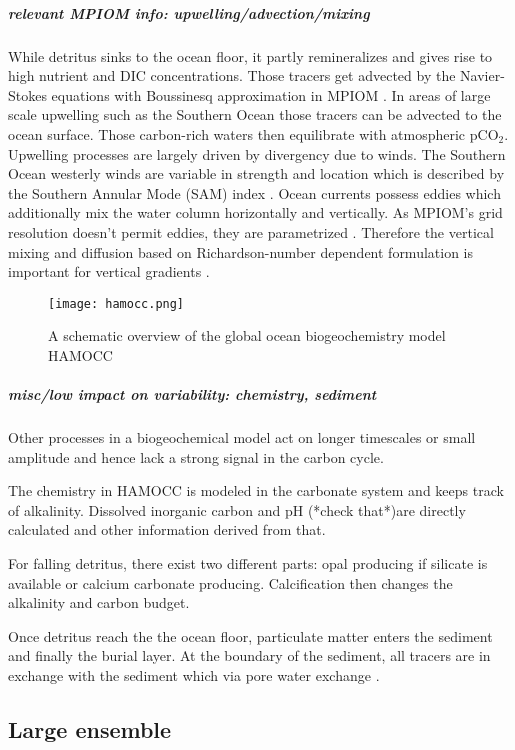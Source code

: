 \documentclass[12pt]{article}
\begin{document}
\subparagraph{relevant MPIOM info: upwelling/advection/mixing}
While detritus sinks to the ocean floor, it partly remineralizes and gives rise to high nutrient and DIC concentrations. Those tracers get advected by the Navier-Stokes equations with Boussinesq approximation in MPIOM \citep{Marsland2003}. In areas of large scale upwelling such as the Southern Ocean those tracers can be advected to the ocean surface. Those carbon-rich waters then equilibrate with atmospheric pCO$_2$. Upwelling processes are largely driven by divergency due to winds. The Southern Ocean westerly winds are variable in strength and location which is described by the Southern Annular Mode (SAM) index \citep{Gong1999}. Ocean currents possess eddies which additionally mix the water column horizontally and vertically. As MPIOM's grid resolution doesn't permit eddies, they are parametrized \citep{Gent1995}. Therefore the vertical mixing and diffusion based on Richardson-number dependent formulation is important for vertical gradients \citep{Pacanowski1981}. 

\begin{figure}[h!]
	\centering
	\texttt{[image: hamocc.png]}
	\caption{A schematic overview of the global ocean biogeochemistry model HAMOCC \citep{Ilyina2013}}
	\label{fig:HAMOCC}
\end{figure}

\subparagraph{misc/low impact on variability: chemistry, sediment}
Other processes in a biogeochemical model act on longer timescales or small amplitude and hence lack a strong signal in the carbon cycle. 

The chemistry in HAMOCC is modeled in the carbonate system and keeps track of alkalinity. Dissolved inorganic carbon and pH (*check that*)are directly calculated and other information derived from that.

For falling detritus, there exist two different parts: opal producing if silicate is available or calcium carbonate producing. Calcification then changes the alkalinity and carbon budget.

Once detritus reach the the ocean floor, particulate matter enters the sediment and finally the burial layer. At the boundary of the sediment, all tracers are in exchange with the sediment which via pore water exchange \citep{Heinze1991}.





\subsection{Large ensemble}
\end{document}
